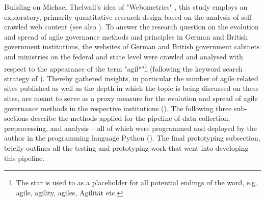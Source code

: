 Building on Michael Thelwall's idea of "Webometrics" \parencite{Thelwall2009}, this study employs an exploratory, primarily quantitative research design based on the analysis of self-crawled web content (see also \cite{Olston2010, Jaeger1998, Ignatow2018}). To answer the research question on the evolution and spread of agile governance methods and principles in German and British government institutions, the websites of German and British government cabinets and ministries on the federal and state level were crawled and analysed with respect to the appearance of the term "agil*"\footnote{The star is used to as a placeholder for all potential endings of the word, e.g. agile, agility, agiles, Agilität etc.} (following the keyword search strategy of \cite{Mergel2018}). Thereby gathered insights, in particular the number of agile related sites published as well as the depth in which the topic is being discussed on these sites, are meant to serve as a proxy measure for the evolution and spread of agile governance methods in the respective institutions (\cite{Branco2006, Ghosh2013}). The following three sub-sections describe the methods applied for the pipeline of data collection, preprocessing, and analysis – all of which were programmed and deployed by the author in the programming language Python (\cite{VanRossum1995}). The final prototyping subsection, briefly outlines all the testing and prototyping work that went into developing this pipeline.


